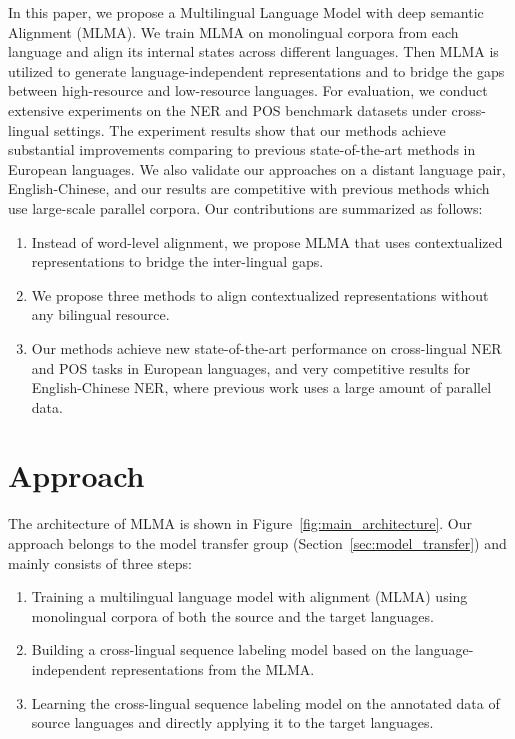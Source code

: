 \documentclass[11pt,a4paper]{article}
\begin{document}
	In this paper, we propose a Multilingual Language Model with deep semantic Alignment (MLMA). We train MLMA on monolingual corpora from each language and align its internal states across different languages. Then MLMA is utilized to generate language-independent representations and to bridge the gaps between high-resource and low-resource languages. For evaluation, we conduct extensive experiments on the NER and POS benchmark datasets under cross-lingual settings. The experiment results show that our methods achieve substantial improvements comparing to previous state-of-the-art methods in European languages. We also validate our approaches on a distant language pair, English-Chinese, and our results are competitive with previous methods which use large-scale parallel corpora. Our contributions are summarized as follows:%
	\begin{enumerate}\setlength{\itemsep}{-0.1cm}%
		\item Instead of word-level alignment, we propose MLMA that uses contextualized representations to bridge the inter-lingual gaps.
		\item We propose three methods to align contextualized representations without any bilingual resource.
		\item Our methods achieve new state-of-the-art performance on cross-lingual NER and POS tasks in European languages, and very competitive results for English-Chinese NER, where previous work uses a large amount of parallel data.
	\end{enumerate}
	
	\section{Approach}
	The architecture of MLMA is shown in Figure~\ref{fig:main_architecture}. Our approach belongs to the model transfer group (Section~\ref{sec:model_transfer}) and mainly consists of three steps:
	\begin{enumerate}\setlength{\itemsep}{-0.1cm}
	\item Training a multilingual language model with alignment (MLMA) using monolingual corpora of both the source and the target languages.
	\item Building a cross-lingual sequence labeling model based on the language-independent representations from the MLMA. %
	\item Learning the cross-lingual sequence labeling model on the annotated data of source languages and directly applying it to the target languages. 
	\end{enumerate}
	
\end{document}
